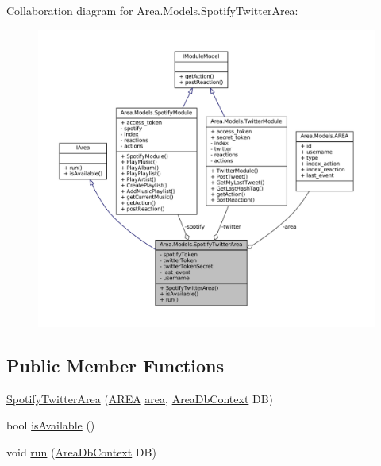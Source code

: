 Collaboration diagram for Area.\+Models.\+Spotify\+Twitter\+Area\+:
\nopagebreak
\begin{figure}[H]
\begin{center}
\leavevmode
\includegraphics[width=350pt]{classArea_1_1Models_1_1SpotifyTwitterArea__coll__graph}
\end{center}
\end{figure}
\subsection*{Public Member Functions}
\begin{DoxyCompactItemize}
\item 
\mbox{\hyperlink{classArea_1_1Models_1_1SpotifyTwitterArea_ac1f04eeaee3f2e91e432175669170069}{Spotify\+Twitter\+Area}} (\mbox{\hyperlink{classArea_1_1Models_1_1AREA}{A\+R\+EA}} \mbox{\hyperlink{classArea_1_1Models_1_1SpotifyTwitterArea_a50307f9bb36968806af0a2bcca474e3c}{area}}, \mbox{\hyperlink{classArea_1_1DAT_1_1AreaDbContext}{Area\+Db\+Context}} DB)
\item 
bool \mbox{\hyperlink{classArea_1_1Models_1_1SpotifyTwitterArea_a087443bd0237323d56e02286868b0345}{is\+Available}} ()
\item 
void \mbox{\hyperlink{classArea_1_1Models_1_1SpotifyTwitterArea_ada41191b6c76e9be5677b1e4e175ea23}{run}} (\mbox{\hyperlink{classArea_1_1DAT_1_1AreaDbContext}{Area\+Db\+Context}} DB)
\end{DoxyCompactItemize}
